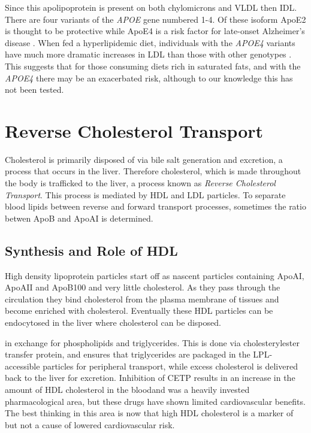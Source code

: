 \documentclass{tufte-handout}
\begin{document}
  Since this apolipoprotein is present on both chylomicrons and VLDL then IDL.  There are four variants of the \textit{APOE} gene numbered 1-4.  Of these isoform ApoE2 is thought to be protective while ApoE4 is a risk factor for late-onset Alzheimer's disease \citep{Poirier1993,Corder1993}.  When fed a hyperlipidemic diet, individuals with the \textit{APOE4} variants have much more dramatic increases in LDL than those with other genotypes \citep{Lehtimaki1992}.  This suggests that for those consuming diets rich in saturated fats, and with the \textit{APOE4} there may be an exacerbated risk, although to our knowledge this has not been tested.

\section{Reverse Cholesterol Transport}

Cholesterol is primarily disposed of via bile salt generation and excretion, a process that occurs in the liver.  Therefore cholesterol, which is made throughout the body is trafficked to the liver, a process known as \emph{Reverse Cholesterol Transport}.  This process is mediated by HDL and LDL particles.  To separate blood lipids between reverse and forward transport processes, sometimes the ratio betwen ApoB and ApoAI is determined.

\subsection{Synthesis and Role of HDL}

High density lipoprotein particles start off as nascent particles containing ApoAI, ApoAII and ApoB100 and very little cholesterol.  As they pass through the circulation they bind cholesterol from the plasma membrane of tissues and become enriched with cholesterol.  Eventually these HDL particles can be endocytosed in the liver where cholesterol can be disposed.

 in exchange for phospholipids and triglycerides.  This is done via cholesterylester transfer protein, and ensures that triglycerides are packaged in the LPL-accessible particles for peripheral transport, while excess cholesterol is delivered back to the liver for excretion.   Inhibition of CETP results in an increase in the amount of  HDL cholesterol in the bloodand was a heavily invested pharmacological area, but these drugs have shown limited cardiovascular benefits.  The best thinking in this area is now that high HDL cholesterol is a marker of but not a cause of lowered cardiovascular risk.
\end{document}

